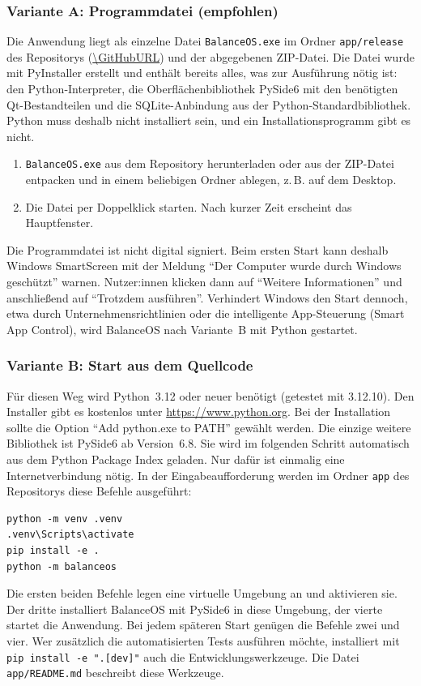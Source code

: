 \subsubsection{Variante A: Programmdatei (empfohlen)}
Die Anwendung liegt als einzelne Datei \texttt{BalanceOS.exe} im Ordner \texttt{app/release} des Repositorys (\url{\GitHubURL}) und der abgegebenen ZIP-Datei. Die Datei wurde mit PyInstaller erstellt \parencite{pyinstaller} und enthält bereits alles, was zur Ausführung nötig ist: den Python-Interpreter, die Oberflächenbibliothek PySide6 \parencite{pyside6} mit den benötigten Qt-Bestandteilen und die SQLite-Anbindung aus der Python-Standardbibliothek. Python muss deshalb nicht installiert sein, und ein Installationsprogramm gibt es nicht.
\begin{enumerate}
  \item \texttt{BalanceOS.exe} aus dem Repository herunterladen oder aus der ZIP-Datei entpacken und in einem beliebigen Ordner ablegen, z.\,B. auf dem Desktop.
  \item Die Datei per Doppelklick starten. Nach kurzer Zeit erscheint das Hauptfenster.
\end{enumerate}
Die Programmdatei ist nicht digital signiert. Beim ersten Start kann deshalb Windows SmartScreen mit der Meldung \enquote{Der Computer wurde durch Windows geschützt} warnen. Nutzer:innen klicken dann auf \enquote{Weitere Informationen} und anschließend auf \enquote{Trotzdem ausführen}. Verhindert Windows den Start dennoch, etwa durch Unternehmensrichtlinien oder die intelligente App-Steuerung (Smart App Control), wird BalanceOS nach Variante~B mit Python gestartet.

\subsubsection{Variante B: Start aus dem Quellcode}
Für diesen Weg wird Python~3.12 oder neuer benötigt (getestet mit 3.12.10). Den Installer gibt es kostenlos unter \url{https://www.python.org}. Bei der Installation sollte die Option \enquote{Add python.exe to PATH} gewählt werden. Die einzige weitere Bibliothek ist PySide6 ab Version~6.8. Sie wird im folgenden Schritt automatisch aus dem Python Package Index geladen. Nur dafür ist einmalig eine Internetverbindung nötig. In der Eingabeaufforderung werden im Ordner \texttt{app} des Repositorys diese Befehle ausgeführt:
\begin{lstlisting}
python -m venv .venv
.venv\Scripts\activate
pip install -e .
python -m balanceos
\end{lstlisting}
Die ersten beiden Befehle legen eine virtuelle Umgebung an und aktivieren sie. Der dritte installiert BalanceOS mit PySide6 in diese Umgebung, der vierte startet die Anwendung. Bei jedem späteren Start genügen die Befehle zwei und vier. Wer zusätzlich die automatisierten Tests ausführen möchte, installiert mit \texttt{pip install -e ".[dev]"} auch die Entwicklungswerkzeuge. Die Datei \texttt{app/README.md} beschreibt diese Werkzeuge.

